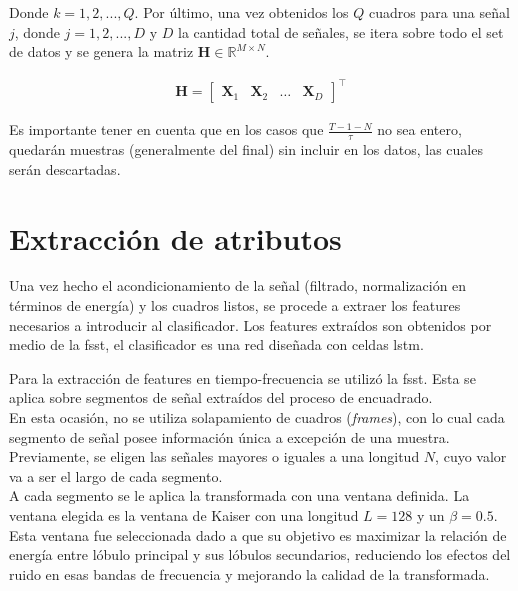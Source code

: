 \indent Donde $k = 1,2,...,Q$. Por último, una vez obtenidos los $Q$ cuadros para una señal $j$, donde $j = 1,2,...,D$ y $D$ la cantidad total de señales, se itera sobre todo el set de datos y se genera la matriz $\bm{H} \in \mathbb{R}^{M \times N}$.

\begin{align}
    \bm{H} = \left[\begin{array}{cccc}
         \bm{X}_1 &
         \bm{X}_2 &
         \dots &
         \bm{X}_D
    \end{array}\right]^\top
\end{align}

\indent Es importante tener en cuenta que en los casos que $\frac{T-1-N}{\tau}$ no sea entero, quedarán muestras (generalmente del final) sin incluir en los datos, las cuales serán descartadas.

\section{Extracción de atributos}

\indent Una vez hecho el acondicionamiento de la señal (filtrado, normalización en términos de energía) y los cuadros listos, se procede a extraer los features necesarios a introducir al clasificador. Los features extraídos son obtenidos por medio de la \acrshort{fsst}, el clasificador es una red diseñada con celdas \acrshort{lstm}. \bigskip

\indent Para la extracción de features en tiempo-frecuencia se utilizó la \acrshort{fsst}. Esta se aplica sobre segmentos de señal extraídos del proceso de encuadrado. \\
\indent En esta ocasión, no se utiliza solapamiento de cuadros (\textit{frames}), con lo cual cada segmento de señal posee información única a excepción de una muestra. Previamente, se eligen las señales mayores o iguales a una longitud $N$, cuyo valor va a ser el largo de cada segmento. \\
\indent A cada segmento se le aplica la transformada con una ventana definida. La ventana elegida es la ventana de Kaiser con una longitud $L = 128$ y un $\beta = 0.5$. Esta ventana fue seleccionada dado a que su objetivo es maximizar la relación de energía entre lóbulo principal y sus lóbulos secundarios, reduciendo los efectos del ruido en esas bandas de frecuencia y mejorando la calidad de la transformada. 

